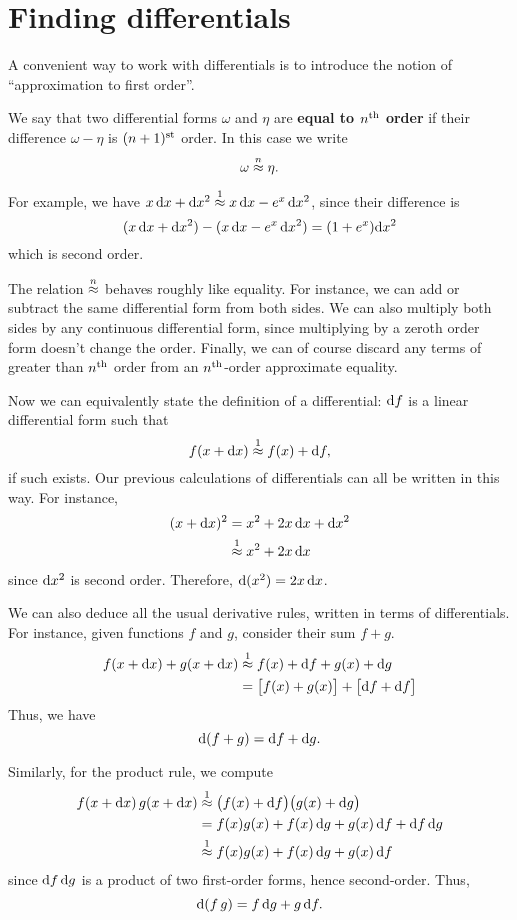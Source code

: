 \documentclass[12pt]{amsart}
\begin{document}


\section{Finding differentials}
\label{sec:differential-rules}

A convenient way to work with differentials is to introduce the notion of ``approximation to first order''.

\begin{defn}
  We say that two differential forms $\omega$ and $\eta$ are \textbf{equal to $n^{\mathrm{th}}$ order} if their difference $\omega-\eta$ is $(n+1)^{\mathrm{st}}$ order.
  In this case we write
  \[\omega\mathrel{\overset{n}{\approx}} \eta.\]
\end{defn}

For example, we have $x\,\mathrm{d} x + \mathrm{d} x^2 \mathrel{\overset{1}{\approx}} x\,\mathrm{d} x - e^x \,\mathrm{d} x^2$, since their difference is
\[ (x\,\mathrm{d} x + \mathrm{d} x^2) - (x\,\mathrm{d} x - e^x\, \mathrm{d} x^2) = (1+e^x)\mathrm{d} x^2 \]
which is second order.

The relation $\mathrel{\overset{n}{\approx}}$ behaves roughly like equality.
For instance, we can add or subtract the same differential form from both sides.
We can also multiply both sides by any continuous differential form, since multiplying by a zeroth order form doesn't change the order.
Finally, we can of course discard any terms of greater than $n^{\mathrm{th}}$ order from an $n^{\mathrm{th}}$-order approximate equality.

Now we can equivalently state the definition of a differential: $\mathrm{d} f$ is a linear differential form such that
\[ f(x+\mathrm{d} x) \mathrel{\overset{1}{\approx}} f(x) + \mathrm{d} f, \]
if such exists.
Our previous calculations of differentials can all be written in this way.
For instance,
\begin{align*}
  (x+\mathrm{d} x)^2 &= x^2 + 2 x\,\mathrm{d} x + \mathrm{d} x^2\\
  &\mathrel{\overset{1}{\approx}} x^2 + 2 x\,\mathrm{d} x
\end{align*}
since $\mathrm{d} x^2$ is second order.
Therefore, $\mathrm{d}(x^2) = 2x\,\mathrm{d} x$.

We can also deduce all the usual derivative rules, written in terms of differentials.
For instance, given functions $f$ and $g$, consider their sum $f+g$.
\begin{align*}
  f(x+\mathrm{d} x) + g(x+\mathrm{d} x)
  &\mathrel{\overset{1}{\approx}} f(x) + \mathrm{d} f + g(x) + \mathrm{d} g\\
  &= \big[f(x) + g(x)\big] + \big[ \mathrm{d} f + \mathrm{d} f \big]
\end{align*}
Thus, we have
\[ \mathrm{d}(f+g) = \mathrm{d} f + \mathrm{d} g. \]

Similarly, for the product rule, we compute
\begin{align*}
  f(x+\mathrm{d} x) \, g(x+\mathrm{d} x)
  &\mathrel{\overset{1}{\approx}} \big(f(x)+\mathrm{d} f\big)\big(g(x) + \mathrm{d} g \big)\\
  &= f(x) g(x) + f(x) \,\mathrm{d} g + g(x) \,\mathrm{d} f + \mathrm{d} f\,\mathrm{d} g\\
  &\mathrel{\overset{1}{\approx}} f(x) g(x) + f(x) \,\mathrm{d} g + g(x) \,\mathrm{d} f
\end{align*}
since $\mathrm{d} f\,\mathrm{d} g$ is a product of two first-order forms, hence second-order.
Thus,
\[ \mathrm{d}(f\,g) = f\,\mathrm{d} g + g\,\mathrm{d} f.\]
\end{document}

